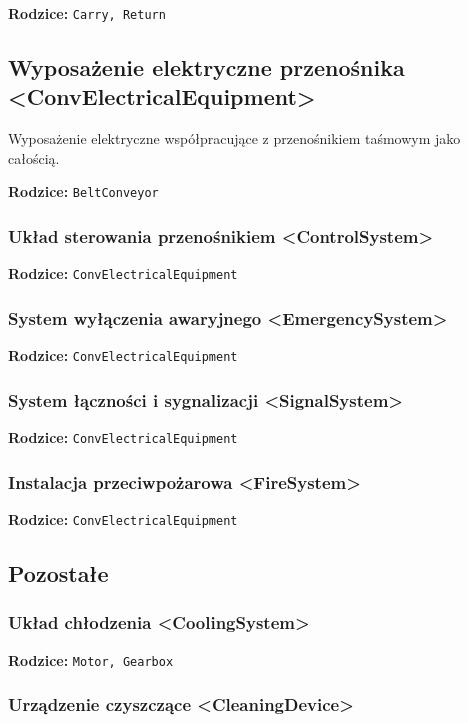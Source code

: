 \documentclass[12pt,a4paper]{article}
\begin{document}
\noindent\textbf{Rodzice:} \texttt{Carry, Return}


\subsection{Wyposażenie elektryczne przenośnika <ConvElectricalEquipment>}
Wyposażenie elektryczne współpracujące z przenośnikiem taśmowym jako całością.

\noindent\textbf{Rodzice:} \texttt{BeltConveyor}


\subsubsection{Układ sterowania przenośnikiem <ControlSystem>}
\noindent\textbf{Rodzice:} \texttt{ConvElectricalEquipment}

\subsubsection{System wyłączenia awaryjnego <EmergencySystem>}
\noindent\textbf{Rodzice:} \texttt{ConvElectricalEquipment}

\subsubsection{System łączności i sygnalizacji <SignalSystem>}
\noindent\textbf{Rodzice:} \texttt{ConvElectricalEquipment}

\subsubsection{Instalacja przeciwpożarowa <FireSystem>}
\noindent\textbf{Rodzice:} \texttt{ConvElectricalEquipment}

\subsection{Pozostałe}

\subsubsection{Układ chłodzenia <CoolingSystem>}
\noindent\textbf{Rodzice:} \texttt{Motor, Gearbox}

\subsubsection{Urządzenie czyszczące <CleaningDevice>}
\end{document}
